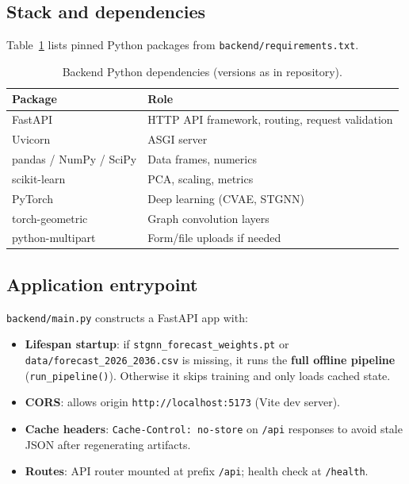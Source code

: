 \documentclass[11pt,a4paper]{article}
\begin{document}
\subsection{Stack and dependencies}
Table~\ref{tab:pydeps} lists pinned Python packages from \texttt{backend/requirements.txt}.

\begin{table}[H]
  \centering
  \caption{Backend Python dependencies (versions as in repository).}
  \label{tab:pydeps}
  \begin{tabular}{@{}ll@{}}
    \toprule
    \textbf{Package} & \textbf{Role} \\
    \midrule
    FastAPI & HTTP API framework, routing, request validation \\
    Uvicorn & ASGI server \\
    pandas / NumPy / SciPy & Data frames, numerics \\
    scikit-learn & PCA, scaling, metrics \\
    PyTorch & Deep learning (CVAE, STGNN) \\
    torch-geometric & Graph convolution layers \\
    python-multipart & Form/file uploads if needed \\
    \bottomrule
  \end{tabular}
\end{table}

\subsection{Application entrypoint}
\texttt{backend/main.py} constructs a FastAPI app with:
\begin{itemize}
  \item \textbf{Lifespan startup}: if \texttt{stgnn\_forecast\_weights.pt} or \texttt{data/forecast\_2026\_2036.csv} is missing, it runs the \textbf{full offline pipeline} (\texttt{run\_pipeline()}). Otherwise it skips training and only loads cached state.
  \item \textbf{CORS}: allows origin \texttt{http://localhost:5173} (Vite dev server).
  \item \textbf{Cache headers}: \texttt{Cache-Control: no-store} on \texttt{/api} responses to avoid stale JSON after regenerating artifacts.
  \item \textbf{Routes}: API router mounted at prefix \texttt{/api}; health check at \texttt{/health}.
\end{itemize}
\end{document}
